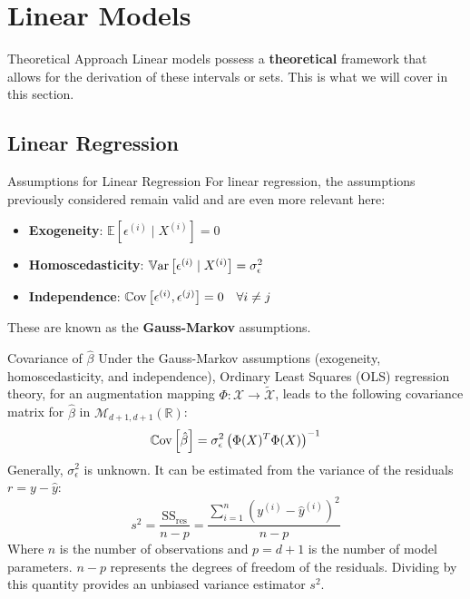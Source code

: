 \section[Linear Models]{Linear Models}

\begin{frame}{Theoretical Approach}
	Linear models possess a \textbf{theoretical} framework that allows for the derivation of these intervals or sets. This is what we will cover in this section.
\end{frame}

\subsection[Linear Regression]{Linear Regression}

\begin{frame}{Assumptions for Linear Regression}
	For linear regression, the assumptions previously considered remain valid and are even more relevant here:
	\begin{itemize}
		\item \textbf{Exogeneity}: $\mathbb{E}[\epsilon^{(i)} \mid X^{(i)}] = 0$
		\item \textbf{Homoscedasticity}: $\operatorname{\mathbb{V}ar}\left[\epsilon^{(i)} \mid X^{(i)}\right] = \sigma_{\epsilon}^2$
		\item \textbf{Independence}: $\operatorname{\mathbb{C}ov}\left[\epsilon^{(i)}, \epsilon^{(j)}\right] = 0 \quad \forall i \ne j$
	\end{itemize}
	These are known as the \textbf{Gauss-Markov} assumptions.
\end{frame}

\begin{frame}{Covariance of $\hat{\beta}$}
	Under the Gauss-Markov assumptions (exogeneity, homoscedasticity, and independence), Ordinary Least Squares (OLS) regression theory, for an augmentation mapping $\Phi: \mathcal{X} \to \tilde{\mathcal{X}}$, leads to the following covariance matrix for $\hat{\beta}$ in $\mathcal{M}_{d+1, d+1}(\mathbb{R})$:
	\begin{equation}
		\operatorname{\mathbb{C}ov}\left[\hat{\beta}\right] = \sigma_{\epsilon}^2 \left(\Phi(X)^T \Phi(X)\right)^{-1}
		\nonumber
	\end{equation}
	\pause
	Generally, $\sigma_{\epsilon}^2$ is unknown. It can be estimated from the variance of the residuals $r = y - \hat{y}$:
	\begin{equation}
		s^2 = \frac{\text{SS}_{\text{res}}}{n - p} = \frac{\sum_{i=1}^n (y^{(i)} - \hat{y}^{(i)})^2}{n - p}
		\nonumber
	\end{equation}
	Where $n$ is the number of observations and $p = d + 1$ is the number of model parameters. $n - p$ represents the degrees of freedom of the residuals. Dividing by this quantity provides an unbiased variance estimator $s^2$.
\end{frame}

